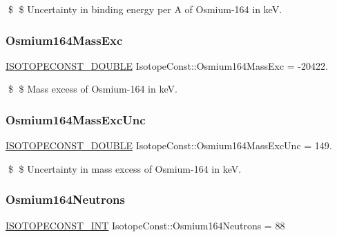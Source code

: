\$ \$ Uncertainty in binding energy per A of Osmium-\/164 in keV. \mbox{\label{group___isotope_const-_osmium-_os164_ga050008063c9db8bc9f7630c6965fb93f}} 
\subsubsection{\texorpdfstring{Osmium164\+Mass\+Exc}{Osmium164MassExc}}
{\footnotesize\ttfamily \mbox{\hyperlink{group___isotope_const-_macros_ga8f45a7272ce02c0b4c65c44636ed719a}{I\+S\+O\+T\+O\+P\+E\+C\+O\+N\+S\+T\+\_\+\+D\+O\+U\+B\+LE}} Isotope\+Const\+::\+Osmium164\+Mass\+Exc = -\/20422.}

\$ \$ Mass excess of Osmium-\/164 in keV. \mbox{\label{group___isotope_const-_osmium-_os164_gaa050a47b27acc179845c083d3495eace}} 
\subsubsection{\texorpdfstring{Osmium164\+Mass\+Exc\+Unc}{Osmium164MassExcUnc}}
{\footnotesize\ttfamily \mbox{\hyperlink{group___isotope_const-_macros_ga8f45a7272ce02c0b4c65c44636ed719a}{I\+S\+O\+T\+O\+P\+E\+C\+O\+N\+S\+T\+\_\+\+D\+O\+U\+B\+LE}} Isotope\+Const\+::\+Osmium164\+Mass\+Exc\+Unc = 149.}

\$ \$ Uncertainty in mass excess of Osmium-\/164 in keV. \mbox{\label{group___isotope_const-_osmium-_os164_gadb0dac1ae9e185ff007afad059c94208}} 
\subsubsection{\texorpdfstring{Osmium164\+Neutrons}{Osmium164Neutrons}}
{\footnotesize\ttfamily \mbox{\hyperlink{group___isotope_const-_macros_ga5f18360b3e99483a35c32d789e62621c}{I\+S\+O\+T\+O\+P\+E\+C\+O\+N\+S\+T\+\_\+\+I\+NT}} Isotope\+Const\+::\+Osmium164\+Neutrons = 88}

